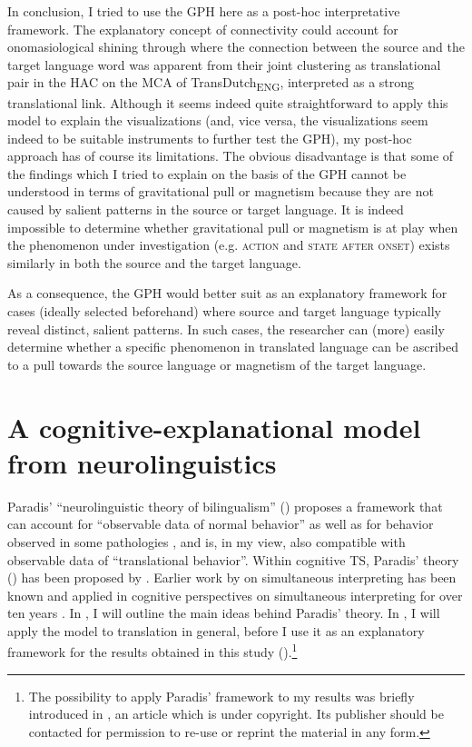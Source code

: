 In conclusion, I tried to use the GPH here as a post-hoc interpretative framework. The explanatory concept of connectivity could account for onomasiological shining through where the connection between the source and the target language word was apparent from their joint clustering as translational pair in the HAC on the MCA of TransDutch\textsubscript{ENG}, interpreted as a strong translational link. Although it seems indeed quite straightforward to apply this model to explain the visualizations (and, vice versa, the visualizations seem indeed to be suitable instruments to further test the GPH), my post-hoc approach has of course its limitations. The obvious disadvantage is that some of the findings which I tried to explain on the basis of the GPH cannot be understood in terms of gravitational pull or magnetism because they are not caused by salient patterns in the source or target language. It is indeed impossible to determine whether gravitational pull or magnetism is at play when the phenomenon under investigation (e.g. \textsc{action} and \textsc{state after onset}) exists similarly in both the source and the target language.

As a consequence, the GPH would better suit as an explanatory framework for cases (ideally selected beforehand) where source and target language typically reveal distinct, salient patterns. In such cases, the researcher can (more) easily determine whether a specific phenomenon in translated language can be ascribed to a pull towards the source language or magnetism of the target language.

\section{A cognitive-explanational model from neurolinguistics}
\label{sec:5.3}  
Paradis’ “neurolinguistic theory of bilingualism” (\citeyear{paradis_neurolinguistic_2004}) proposes a framework that can account for “observable data of normal behavior” as well as for behavior observed in some pathologies \citep[225]{paradis_neurolinguistic_2004}, and is, in my view, also compatible with observable data of “translational behavior”. Within cognitive TS, Paradis’ theory (\citeyear{paradis_neurolinguistic_2004}) has been proposed by \citet{house_towards_2013}. Earlier work by \citet{ellis_neurolinguistic_1994, englund_dimitrova_prerequisites_2000} on simultaneous interpreting has been known and applied in cognitive perspectives on simultaneous interpreting for over ten years \citep{christoffels_cognitive_2004, kroll_simultaneous_2005, de_groot_language_2006}. In , I will outline the main ideas behind Paradis’ theory. In , I will apply the model to translation in general, before I use it as an explanatory framework for the results obtained in this study ().\footnote{The possibility to apply Paradis’ framework to my results was briefly introduced in \citet{VandevoordeEtAl2017}, an article which is under copyright. Its publisher should be contacted for permission to re-use or reprint the material in any form.}

